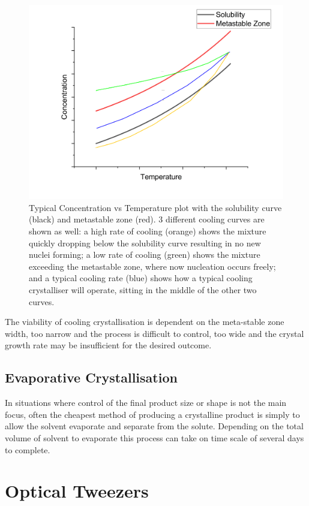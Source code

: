 \begin{figure}[h!]
	\includegraphics[width=\linewidth]{MSZW.png}
	\caption{Typical Concentration vs Temperature plot with the solubility curve (black) and metastable zone (red). 3 different cooling curves are shown as well: a high rate of cooling (orange) shows the mixture quickly dropping below the solubility curve resulting in no new nuclei forming; a low rate of cooling (green) shows the mixture exceeding the metastable zone, where now nucleation occurs freely; and a typical cooling rate (blue) shows how a typical cooling crystalliser will operate, sitting in the middle of the other two curves.}
	\label{fig:MSZW}
\end{figure}

The viability of cooling crystallisation is dependent on the meta-stable 
zone width, too narrow and the process is difficult to control, too wide 
and the crystal growth rate may be insufficient for the desired outcome.

\subsection{Evaporative Crystallisation}
In situations where control of the final product size or shape is not the main
focus, often the cheapest method of producing a crystalline product is simply
to allow the solvent evaporate and separate from the solute. Depending on the 
total volume of solvent to evaporate this process can take on time scale of 
several days to complete.


\section{Optical Tweezers}
